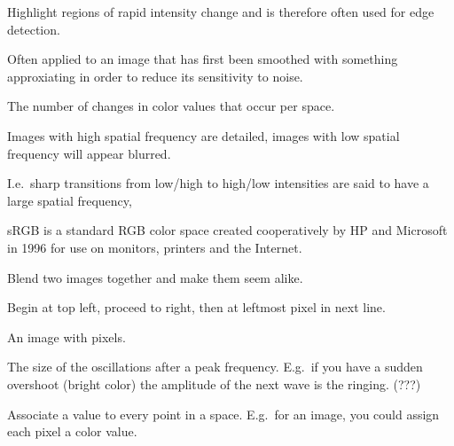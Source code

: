 \begin{definition}[Laplacian]
    Highlight regions of rapid intensity change and is therefore often used for
    edge detection.

    Often applied to an image that has first been smoothed with something
    approxiating in order to reduce its sensitivity to noise.

\end{definition}

\begin{definition}
    The number of changes in color values that occur per space.

    Images with high spatial frequency are detailed, images with low spatial 
    frequency will appear blurred.

    I.e.\ sharp transitions from low/high to high/low intensities are said
    to have a large spatial frequency,

\end{definition}


\begin{definition}[SRGB]
    sRGB is a standard RGB color space created cooperatively by HP and
    Microsoft in 1996 for use on monitors, printers and the Internet.

\end{definition}


\begin{definition}
    Blend two images together and make them seem alike.
\end{definition}

\begin{definition}
    Begin at top left, proceed to right, then at leftmost pixel in next line.
\end{definition}

\begin{definition}
    An image with pixels.
\end{definition}

\begin{definition}[Ringing]
    The size of the oscillations after a peak frequency. E.g.\ if you have a 
    sudden overshoot (bright color) the amplitude of the next wave is
    the ringing. (???)
\end{definition}

\begin{definition}\label{scalarfield}
    Associate a value to every point in a space. E.g.\ for an image, you
    could assign each pixel a color value.
\end{definition}

